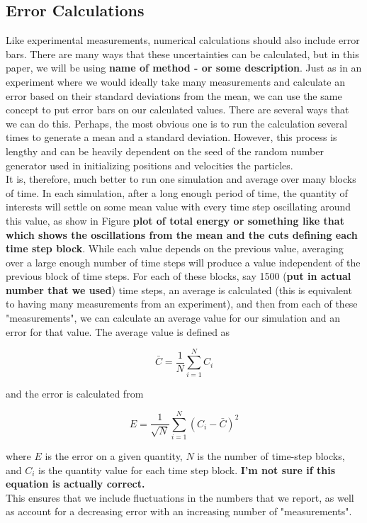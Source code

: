 \documentclass{article}
\begin{document}
\begin{multicols}{2}
\appendix 

\section{Error Calculations}

Like experimental measurements, numerical calculations should also include error bars.  There are many ways that these uncertainties can be calculated, but in this paper, we will be using \textbf{name of method - or some description}.  Just as in an experiment where we would ideally take many measurements and calculate an error based on their standard deviations from the mean, we can use the same concept to put error bars on our calculated values.  There are several ways that we can do this.  Perhaps, the most obvious one is to run the calculation several times to generate a mean and a standard deviation.  However, this process is lengthy and can be heavily dependent on the seed of the random number generator used in initializing positions and velocities the particles.  \\

It is, therefore, much better to run one simulation and average over many blocks of time.  In each simulation, after a long enough period of time, the quantity of interests will settle on some mean value with every time step oscillating around this value, as show in Figure \textbf{plot of total energy or something like that which shows the oscillations from the mean and the cuts defining each time step block}.  While each value depends on the previous value, averaging over a large enough number of time steps will produce a value independent of the previous block of time steps.  For each of these blocks, say 1500 (\textbf{put in actual number that we used}) time steps, an average is calculated (this is equivalent to having many measurements from an experiment), and then from each of these "measurements", we can calculate an average value for our simulation and an error for that value.  The average value is defined as 

\begin{equation}
\bar{C} = \frac{1}{N}\sum \limits _{i=1}^N C_i 
\end{equation}

\noindent and the error is calculated from 

\begin{equation}
E = \frac{1}{\sqrt{N}}\sum \limits _{i=1}^N (C_i - \bar{C})^2
\end{equation}

\noindent where $E$ is the error on a given quantity, $N$ is the number of time-step blocks, and $C_i$ is the quantity value for each time step block.  \textbf{I'm not sure if this equation is actually correct.}\\

This ensures that we include fluctuations in the numbers that we report, as well as account for a decreasing error with an increasing number of "measurements".  


\end{multicols}
\end{document}
